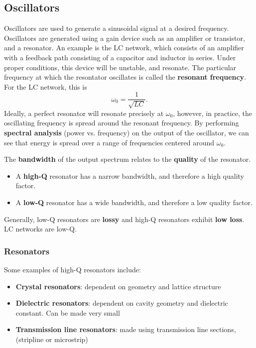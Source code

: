 \documentclass{article}
\begin{document}
\subsection{Oscillators}
Oscillators are used to generate a sinusoidal signal at a desired
frequency. Oscillators are generated using a gain device such as an
amplifier or transistor, and a resonator. An example is the LC network,
which consists of an amplifier with a feedback path consisting of a
capacitor and inductor in series. Under proper conditions, this device
will be unstable, and resonate. The particular frequency at which the
resontator oscillates is called the \textbf{resonant frequency}. For
the LC network, this is
\begin{equation*}
    \omega_0 = \frac{1}{\sqrt{LC}}.
\end{equation*}
Ideally, a perfect resonator will resonate precisely at \(\omega_0\),
however, in practice, the oscillating frequency is spread around the
resonant frequency. By performing \textbf{spectral analysis}
(power vs. frequency) on the output of the oscillator, we can see that
energy is spread over a range of frequencies centered around \(\omega_0\).

The \textbf{bandwidth} of the output spectrum relates to the
\textbf{quality} of the resonator.
\begin{itemize}
    \item A \textbf{high-Q} resonator has a narrow bandwidth, and
          therefore a high quality factor.
    \item A \textbf{low-Q} resonator has a wide bandwidth, and
          therefore a low quality factor.
\end{itemize}
Generally, low-Q resonators are \textbf{lossy} and high-Q resonators
exhibit \textbf{low loss}. LC networks are low-Q.
\subsubsection{Resonators}
Some examples of high-Q resonators include:
\begin{itemize}
    \item \textbf{Crystal resonators}: dependent on geometry and lattice structure
    \item \textbf{Dielectric resonators}: dependent on cavity geometry and dielectric constant. Can be made very small
    \item \textbf{Transmission line resonators}: made using transmission line sections, (stripline or microstrip)
\end{itemize}
\end{document}
